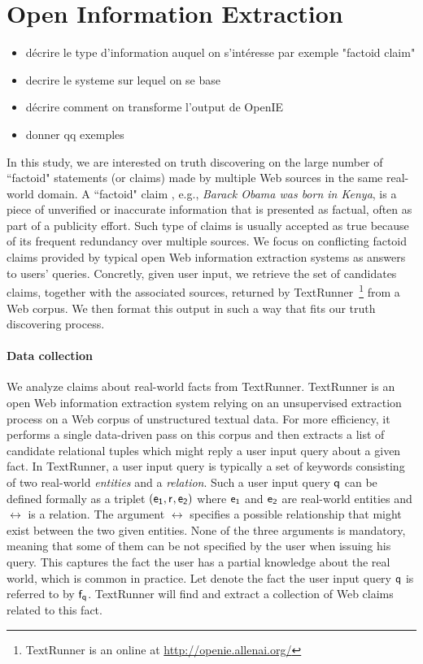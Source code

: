 \section{Open Information Extraction}
\begin{itemize}
 \item décrire le type d'information auquel on s'intéresse par exemple "factoid claim"
 \item decrire le systeme sur lequel on se base
 \item décrire comment on transforme l'output de OpenIE
 \item donner qq exemples
\end{itemize}


In this study, we are interested on truth discovering on the large number of ``factoid" statements
(or claims) made by multiple Web sources in the same real-world domain. A ``factoid" claim , e.g., 
\emph{Barack Obama was born in Kenya}, is
a piece of unverified or inaccurate information that is presented as factual, often
as part of a publicity effort. Such type of claims  is usually accepted as true  because of its
frequent redundancy over multiple sources. We focus on conflicting factoid claims provided by typical 
open Web information extraction systems as answers to users' queries. Concretly, given user input, 
we retrieve the set of candidates claims, together with the associated sources, returned by TextRunner~\footnote{TextRunner is an online
at \href{http://openie.allenai.org/}{http://openie.allenai.org/}}
from a Web corpus. We then format this output in such a way that fits our truth discovering process.



\paragraph*{Data collection} We analyze claims about real-world facts
from TextRunner.
TextRunner is an open Web information extraction system relying
on an unsupervised extraction process on a Web corpus of unstructured textual
data. For more efficiency, it performs a single data-driven pass on 
this corpus and then extracts a list of candidate relational tuples 
which might reply a user input query about a given fact. In TextRunner, 
a user input query is typically a set of keywords
consisting  of two real-world \emph{entities} and a \emph{relation}. Such
a user input query $\mathsf{q}$ can be defined formally as a triplet $(\mathsf{e_{1}}, \mathsf{r}_{}, \mathsf{e_{2}})$
where $\mathsf{e_{1}}$ and $\mathsf{e_{2}}$ are real-world entities and $\rel{}$ is a relation. The argument $\rel{}$ 
specifies a possible relationship that might exist between the two given entities. None of the three 
arguments is mandatory, meaning that some of them can be not specified by the user when issuing 
his query. This captures the fact the user has a partial knowledge about the real world, which is 
common in practice. Let denote the fact the user input query $\mathsf{q}$ is referred to by $\mathsf{f}_{\mathsf{q}}$. 
TextRunner will find and extract a collection of Web claims related to this fact.

